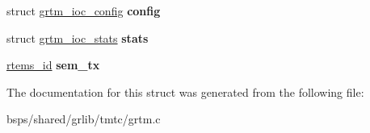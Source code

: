 \begin{DoxyCompactItemize}
struct \mbox{\hyperlink{structgrtm__ioc__config}{grtm\+\_\+ioc\+\_\+config}} {\bfseries config}
\item 
\mbox{\label{structgrtm__priv_a0cfed4ae35f8824790e0d59511cad114}} 
struct \mbox{\hyperlink{structgrtm__ioc__stats}{grtm\+\_\+ioc\+\_\+stats}} {\bfseries stats}
\item 
\mbox{\label{structgrtm__priv_a95d0c0f067c2d3e65c7f1a97d170658a}} 
\mbox{\hyperlink{group__ClassicTasks_gab20892b814dced7dd4e5b9bf42becd57}{rtems\+\_\+id}} {\bfseries sem\+\_\+tx}
\end{DoxyCompactItemize}


The documentation for this struct was generated from the following file\+:\begin{DoxyCompactItemize}
\item 
bsps/shared/grlib/tmtc/grtm.\+c\end{DoxyCompactItemize}
